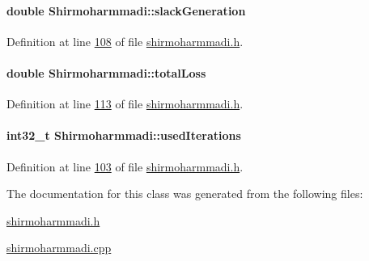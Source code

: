 \paragraph[{slack\+Generation}]{\setlength{\rightskip}{0pt plus 5cm}double Shirmoharmmadi\+::slack\+Generation}\label{class_shirmoharmmadi_aeb47da6439c2e92c7ebcc59ebb71624b}


Definition at line \hyperlink{shirmoharmmadi_8h_source_l00108}{108} of file \hyperlink{shirmoharmmadi_8h_source}{shirmoharmmadi.\+h}.

\hypertarget{class_shirmoharmmadi_a0c02ead0472b54a84fc746a13b8d02b2}{}
\paragraph[{total\+Loss}]{\setlength{\rightskip}{0pt plus 5cm}double Shirmoharmmadi\+::total\+Loss}\label{class_shirmoharmmadi_a0c02ead0472b54a84fc746a13b8d02b2}


Definition at line \hyperlink{shirmoharmmadi_8h_source_l00113}{113} of file \hyperlink{shirmoharmmadi_8h_source}{shirmoharmmadi.\+h}.

\hypertarget{class_shirmoharmmadi_afdd22da0145b033c47f4f8a6bbd37d0d}{}
\paragraph[{used\+Iterations}]{\setlength{\rightskip}{0pt plus 5cm}int32\+\_\+t Shirmoharmmadi\+::used\+Iterations}\label{class_shirmoharmmadi_afdd22da0145b033c47f4f8a6bbd37d0d}


Definition at line \hyperlink{shirmoharmmadi_8h_source_l00103}{103} of file \hyperlink{shirmoharmmadi_8h_source}{shirmoharmmadi.\+h}.



The documentation for this class was generated from the following files\+:\begin{DoxyCompactItemize}
\item 
\hyperlink{shirmoharmmadi_8h}{shirmoharmmadi.\+h}\item 
\hyperlink{shirmoharmmadi_8cpp}{shirmoharmmadi.\+cpp}\end{DoxyCompactItemize}
